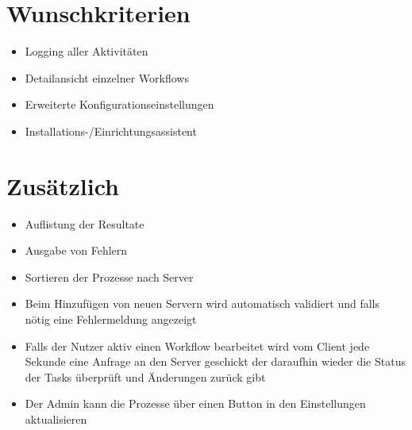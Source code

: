     \section{Wunschkriterien}
    
        \begin{itemize}
			\item Logging aller Aktivitäten
			\item Detailansicht einzelner Workflows
			\item Erweiterte Konfigurationseinstellungen
			\item Installations-/Einrichtungsassistent
		\end{itemize}
    
    \section{Zusätzlich}
    
        \begin{itemize}
            \item Auflistung der Resultate
            \item Ausgabe von Fehlern
            \item Sortieren der Prozesse nach Server
            \item Beim Hinzufügen von neuen Servern wird automatisch validiert und falls nötig eine Fehlermeldung angezeigt
            \item Falls der Nutzer aktiv einen Workflow bearbeitet wird vom Client jede Sekunde eine Anfrage an den Server geschickt der daraufhin wieder die Status der Tasks überprüft und Änderungen zurück gibt
            \item Der Admin kann die Prozesse über einen Button in den Einstellungen aktualisieren
        \end{itemize}